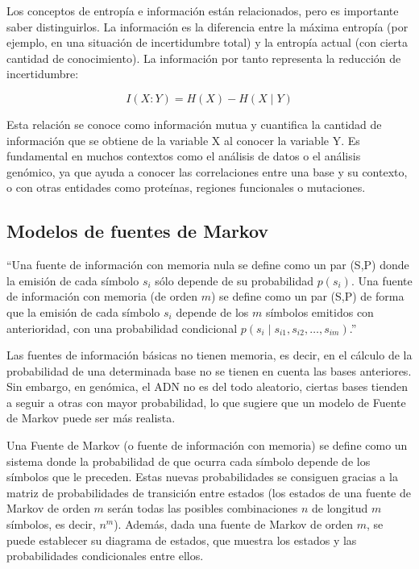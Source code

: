 \documentclass[11pt,spanish,listoffigures,listoftables]{tfgetsinf}
\begin{document}
Los conceptos de entropía e información están relacionados, pero es importante saber distinguirlos. La información es la diferencia entre la máxima entropía (por ejemplo, en una situación de incertidumbre total) y la entropía actual (con cierta cantidad de conocimiento). La información por tanto representa la reducción de incertidumbre:

\[
I(X:Y) = H(X) - H(X \mid Y)
\]

Esta relación se conoce como información mutua y cuantifica la cantidad de información que se obtiene de la variable X al conocer la variable Y. Es fundamental en muchos contextos como el análisis de datos o el análisis genómico, ya que ayuda a conocer las correlaciones entre una base y su contexto, o con otras entidades como proteínas, regiones funcionales o mutaciones. 


\subsection{Modelos de fuentes de Markov}

“Una fuente de información con memoria nula se define como un par (S,P) donde la emisión de cada símbolo \( s_i \) sólo depende de su probabilidad \( p(s_i) \). Una fuente de información con memoria (de orden \( m \)) se define como un par (S,P) de forma que la emisión de cada símbolo \( s_i \) depende de los \( m \) símbolos emitidos con anterioridad, con una probabilidad condicional \( p(s_i \mid s_{i1}, s_{i2}, \dots, s_{im}) \).”\cite[p.~19]{ROB}

Las fuentes de información básicas no tienen memoria, es decir, en el cálculo de la probabilidad de una determinada base no se tienen en cuenta las bases anteriores. Sin embargo, en genómica, el \acs{ADN} no es del todo aleatorio, ciertas bases tienden a seguir a otras con mayor probabilidad, lo que sugiere que un modelo de Fuente de Markov puede ser más realista. 


Una Fuente de Markov (o fuente de información con memoria) se define como un sistema donde la probabilidad de que ocurra cada símbolo depende de los símbolos que le preceden. Estas nuevas probabilidades se consiguen gracias a la matriz de probabilidades de transición entre estados (los estados de una fuente de Markov de orden \( m \) serán todas las posibles combinaciones \( n \) de longitud \( m \) símbolos, es decir, \( n^m \)). Además, dada una fuente de Markov de orden \( m \), se puede establecer su diagrama de estados, que muestra los estados y las probabilidades condicionales entre ellos\cite[p.~20]{ROB}.
\end{document}
